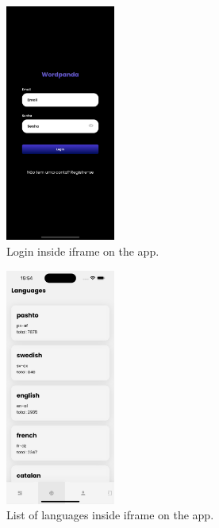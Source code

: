 \documentclass[12pt]{article}
\begin{document}
  \begin{figure}[!h]
    \centering
    \caption{
    Login inside iframe on the app.
    }
    \label{fig:app1}
    \includegraphics[width=0.32\textwidth]{assets/14.png}
  \end{figure}

 

  \begin{figure}[!h]
    \centering
    \caption{
     List of languages inside iframe on the app.
    }
    \label{fig:app3}
    \includegraphics[width=0.32\textwidth]{assets/16.png}
  \end{figure}
\end{document}
